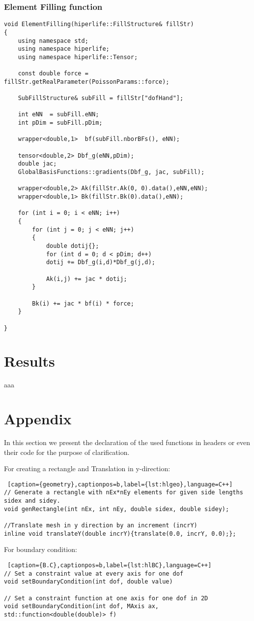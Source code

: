 \documentclass[]{article}
\begin{document}
\subsubsection{Element Filling function} \label{sec: elff}
\begin{lstlisting}	
void ElementFilling(hiperlife::FillStructure& fillStr)
{
	using namespace std;
	using namespace hiperlife;
	using namespace hiperlife::Tensor;

	const double force = fillStr.getRealParameter(PoissonParams::force);
		
	SubFillStructure& subFill = fillStr["dofHand"];

	int eNN  = subFill.eNN;
	int pDim = subFill.pDim;
		
	wrapper<double,1>  bf(subFill.nborBFs(), eNN);
		
	tensor<double,2> Dbf_g(eNN,pDim);
	double jac;
	GlobalBasisFunctions::gradients(Dbf_g, jac, subFill);
		
	wrapper<double,2> Ak(fillStr.Ak(0, 0).data(),eNN,eNN);
	wrapper<double,1> Bk(fillStr.Bk(0).data(),eNN);
		
	for (int i = 0; i < eNN; i++)
	{
		for (int j = 0; j < eNN; j++)
		{
			double dotij{};
			for (int d = 0; d < pDim; d++)
			dotij += Dbf_g(i,d)*Dbf_g(j,d);
				
			Ak(i,j) += jac * dotij;
		}
			
		Bk(i) += jac * bf(i) * force;
	}
		
}
\end{lstlisting}
\section{Results} \label{sec: rst}
aaa
\section*{Appendix} \label{sec: apx}
In this section we present the declaration of the used functions in headers or even their code for the purpose of clarification.

For creating a rectangle and Translation in y-direction:
\begin{lstlisting} [caption={geometry},captionpos=b,label={lst:hlgeo},language=C++]
// Generate a rectangle with nEx*nEy elements for given side lengths sidex and sidey.
void genRectangle(int nEx, int nEy, double sidex, double sidey);

//Translate mesh in y direction by an increment (incrY)
inline void translateY(double incrY){translate(0.0, incrY, 0.0);};
\end{lstlisting}

For boundary condition:
\begin{lstlisting} [caption={B.C},captionpos=b,label={lst:hlBC},language=C++]
// Set a constraint value at every axis for one dof
void setBoundaryCondition(int dof, double value)

// Set a constraint function at one axis for one dof in 2D
void setBoundaryCondition(int dof, MAxis ax, std::function<double(double)> f)
\end{lstlisting}
\end{document}

